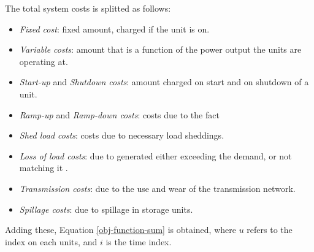 The total system costs is splitted as follows:
\begin{itemize}
    \item \textit{Fixed cost}: fixed amount, charged if the unit is on.
    \item \textit{Variable costs}: amount that is a function of the power output the units are operating at.
    \item \textit{Start-up} and \textit{Shutdown costs}: amount charged on start and on shutdown of a unit.
    \item \textit{Ramp-up} and \textit{Ramp-down costs}: costs due to the fact 
    \item \textit{Shed load costs}: costs due to necessary load sheddings.
    \item \textit{Loss of load costs}: due to generated either exceeding the demand, or not matching it .
    \item \textit{Transmission costs}: due to the use and wear of the transmission network.
    \item \textit{Spillage costs}: due to spillage in storage units.
\end{itemize}

Adding these, Equation \ref{obj-function-sum} is obtained, where $u$ refers to the index on each units, and $i$ is the time index.


